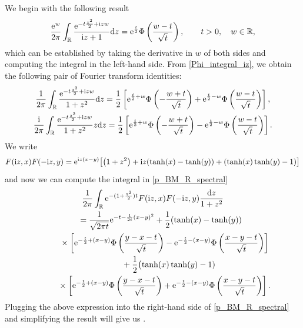 \documentclass[pdftex]{sigma}
\numberwithin{equation}{section}
\theoremstyle{definition}
\def\r{{\mathbb R}}
\def\d{{\textnormal d}}
\def\i{{\textnormal i}}
\begin{document}
We begin with the following result
\begin{equation}
 \label{Phi_integral_iz}
 \frac{{\rm e}^{w}}{2\pi } \int_{\r} \frac{{\rm e}^{-t\frac{z^2}{2}+\i zw }}{\i z+1} \d z=
 {\rm e}^{\frac{t}{2}} \Phi\left(\frac{w-t}{\sqrt{t}}\right), \qquad t>0, \quad w\in \r,
\end{equation}
which can be established by taking the derivative in $w$ of both sides and computing the integral in the left-hand side. From
\eqref{Phi_integral_iz}, we obtain the following pair of Fourier transform identities:
\begin{gather}
 \frac{1}{2\pi} \int_{\r} \frac{{\rm e}^{- t \frac{z^2}2 + \i z w }}{1+z^2} \d z=
 \frac{1}{2} \left[ {\rm e}^{\frac{t}{2} + w} \Phi\left( - \frac{w+t}{\sqrt{t}}\right) +
 {\rm e}^{\frac{t}{2} - w} \Phi\left( \frac{w-t}{\sqrt{t}}\right)\right],\label{Fourier1}\\
 \frac{\i}{2\pi} \int_{\r} \frac{{\rm e}^{- t \frac{z^2}2 + \i z w }}{1+z^2} z \d z=
 \frac{1}{2} \left[ {\rm e}^{\frac{t}{2} + w} \Phi\left( - \frac{w+t}{\sqrt{t}}\right) -
 {\rm e}^{\frac{t}{2} - w} \Phi\left( \frac{w-t}{\sqrt{t}}\right)\right]. \label{Fourier2}
\end{gather}
We write
\[
F(\i z ,x) F(-\i z,y)={\rm e}^{\i z (x-y) }
\big[ \bigl(1+z^2\bigr) + \i z (\tanh(x)-\tanh(y))+(\tanh(x)\tanh(y)-1)\big]
\]
and now we can compute the integral in \eqref{p_BM_R_spectral}
\begin{gather*}
\frac{1}{2\pi} \int_{\r} {\rm e}^{- (1+\frac{z^2}{2})t}
F(\i z,x) F(-\i z, y) \frac{\d z}{1+z^2}\\
\qquad=\frac{1}{\sqrt{2\pi t}} {\rm e}^{-t-\frac{1}{2t}(x-y)^2} +\frac{1}{2} (\tanh(x)-\tanh(y))\\
\phantom{\qquad=}{}\times \left[ {\rm e}^{-\frac{t}{2} + (x-y)} \Phi\left( \frac{y-x-t}{\sqrt{t}}\right) -
 {\rm e}^{-\frac{t}{2} - (x-y)} \Phi\left( \frac{x-y-t}{\sqrt{t}}\right)\right]\\
\phantom{\qquad=\times}{}+\frac{1}{2} \bigl(\tanh(x) \tanh(y) -1)\\
\phantom{\qquad=}{}\times
\left[ {\rm e}^{-\frac{t}{2} + (x-y)} \Phi\left( \frac{y-x-t}{\sqrt{t}}\right) +
 {\rm e}^{-\frac{t}{2} - (x-y)} \Phi\left( \frac{x-y-t}{\sqrt{t}}\right)\right].
\end{gather*}
Plugging the above expression into the right-hand side of \eqref{p_BM_R_spectral} and simplifying the result will give us .
\end{document}
